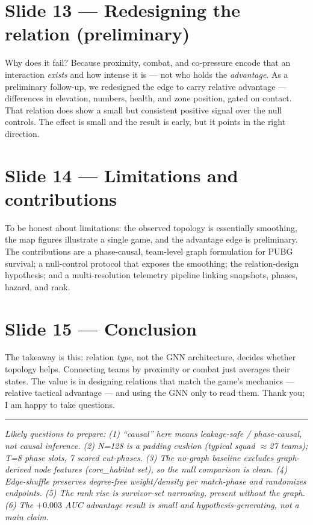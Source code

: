\documentclass[11pt]{article}
\begin{document}
\section{Slide 13 --- Redesigning the relation (preliminary)}
Why does it fail? Because proximity, combat, and co-pressure encode that an interaction \emph{exists} and how intense it is --- not who holds the \emph{advantage}. As a preliminary follow-up, we redesigned the edge to carry relative advantage --- differences in elevation, numbers, health, and zone position, gated on contact. That relation does show a small but consistent positive signal over the null controls. The effect is small and the result is early, but it points in the right direction.

\section{Slide 14 --- Limitations and contributions}
To be honest about limitations: the observed topology is essentially smoothing, the map figures illustrate a single game, and the advantage edge is preliminary. The contributions are a phase-causal, team-level graph formulation for PUBG survival; a null-control protocol that exposes the smoothing; the relation-design hypothesis; and a multi-resolution telemetry pipeline linking snapshots, phases, hazard, and rank.

\section{Slide 15 --- Conclusion}
The takeaway is this: relation \emph{type}, not the GNN architecture, decides whether topology helps. Connecting teams by proximity or combat just averages their states. The value is in designing relations that match the game's mechanics --- relative tactical advantage --- and using the GNN only to read them. Thank you; I am happy to take questions.

\vspace{1em}\hrule
\vspace{0.4em}
\noindent\small\textit{Likely questions to prepare: (1) ``causal'' here means leakage-safe / phase-causal, not causal inference. (2) N=128 is a padding cushion (typical squad $\approx$27 teams); T=8 phase slots, 7 scored cut-phases. (3) The no-graph baseline excludes graph-derived node features (core\_habitat set), so the null comparison is clean. (4) Edge-shuffle preserves degree-free weight/density per match-phase and randomizes endpoints. (5) The rank rise is survivor-set narrowing, present without the graph. (6) The $+0.003$ AUC advantage result is small and hypothesis-generating, not a main claim.}
\end{document}
